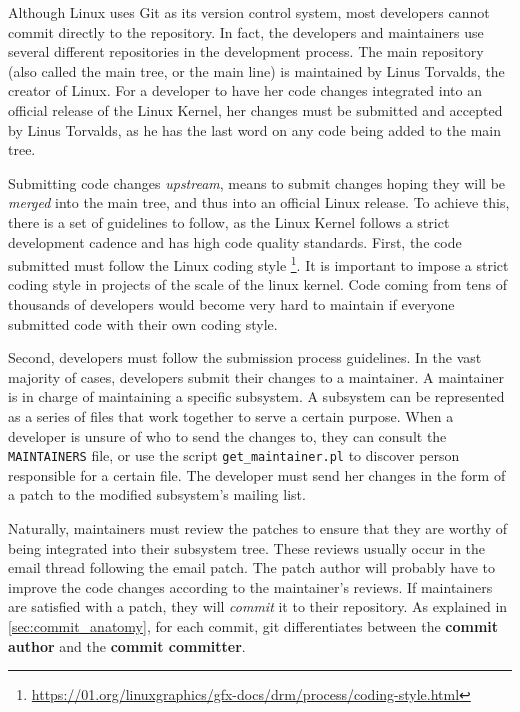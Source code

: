 \label{sec:Introduction}  

Although Linux uses Git as its version control system, most developers cannot commit directly to the repository. In fact, the developers and maintainers use several different repositories in the development process. The main repository (also called the main tree, or the main line) is maintained by Linus Torvalds, the creator of Linux. For a developer to have her code changes integrated into an official release of the Linux Kernel, her changes must be submitted and accepted by Linus Torvalds, as he has the last word on any code being added to the main tree. 

Submitting code changes \textit{upstream}, means to submit changes hoping they will be \textit{merged} into the main tree, and thus into an official Linux release. To achieve this, there is a set of guidelines to follow, as the Linux Kernel follows a strict development cadence and has high code quality standards. First, the code submitted must follow the Linux coding style \footnote{\url{https://01.org/linuxgraphics/gfx-docs/drm/process/coding-style.html}}. It is important to impose a strict coding style in projects of the scale of the linux kernel. Code coming from tens of thousands of developers would become very hard to maintain if everyone submitted code with their own coding style. 

Second, developers must follow the submission process guidelines. In the vast majority of cases, developers submit their changes to a maintainer. A maintainer is in charge of maintaining a specific subsystem. A subsystem can be represented as a series of files that work together to serve a certain purpose. When a developer is unsure of who to send the changes to, they can consult the \texttt{MAINTAINERS} file, or use the script \texttt{get\_maintainer.pl} to discover person responsible for a certain file. The developer must send her changes in the form of a patch to the modified subsystem's mailing list. 

Naturally, maintainers must review the patches to ensure that they are worthy of being integrated into their subsystem tree. These reviews usually occur in the email thread following the email patch. The patch author will probably have to improve the code changes according to the maintainer's reviews. If maintainers are satisfied with a patch, they will \textit{commit} it to their repository. As explained in \autoref{sec:commit_anatomy}, for each commit, git differentiates between the \textbf{commit author} and the \textbf{commit committer}. 

